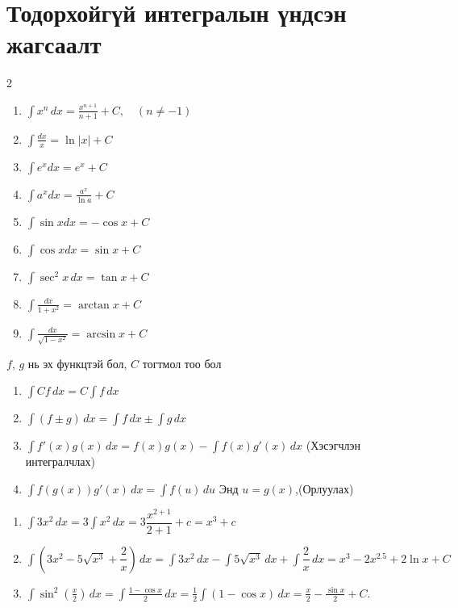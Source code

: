 \section{Тодорхойгүй интегралын үндсэн жагсаалт}
\begin{multicols}{2}
\begin{enumerate}
\item $\displaystyle\int x^n\,dx = \frac{x^{n+1}}{n+1}+C,\quad (n\neq -1)$
\item $\displaystyle\int \frac{dx}{x}= \ln |x|+C$
\item $\displaystyle\int e^x dx = e^x +C $
\item $\displaystyle\int a^x dx = \frac{a^x}{\ln a}+C$
\item $\displaystyle\int \sin x dx = -\cos x + C $
\item $\displaystyle\int \cos x dx = \sin x + C$
\item $\displaystyle\int \sec^2 x\, dx = \tan x +C$ 
\item $\displaystyle\int \frac{dx}{1+x^2}= \arctan x + C$
\item $\displaystyle\int \frac{dx}{\sqrt{1-x^2}} = \arcsin x +C$
\end{enumerate}
\end{multicols}
\begin{theorem} $f, \, g$ нь эх функцтэй бол, $C$ тогтмол тоо бол
  \begin{enumerate}
  \item $\displaystyle \int Cf\,dx=C\displaystyle \int f\,dx$ 
\item $\displaystyle \int (f\pm g)\,dx = \int f\,dx \pm \int g\,dx$
\item $\displaystyle \int f'(x)g(x)\,dx = f(x)g(x) - \int f(x)g'(x)\,dx$ (Хэсэгчлэн интегралчлах)
\item $\displaystyle \int f(g(x))g'(x)\,dx = \int f(u)\,du$ Энд $u=g(x)$,\quad (Орлуулах)
  \end{enumerate}
\end{theorem}
\begin{example}
\begin{enumerate}
\item $\displaystyle \int 3x^2\,dx=3\displaystyle \int x^2\,dx=3\dfrac{x^{2+1}}{2+1}+c=x^3+c$
\item $\displaystyle \int (3x^2 - 5\sqrt{x^3} + \dfrac{2}{x})\,dx=\displaystyle \int 3x^2 \,dx-\displaystyle \int  5\sqrt{x^3}\,dx+\displaystyle \int\dfrac{2}{x}\,dx=x^3-2x^{2.5}+2\ln x+C$
\item $
\displaystyle\int \sin^2\!\left(\frac{x}{2}\right)\,dx
= \int \frac{1-\cos x}{2}\,dx
= \frac12\int (1-\cos x)\,dx
= \frac{x}{2} - \frac{\sin x}{2} + C.
$
\end{enumerate}  
\end{example}
